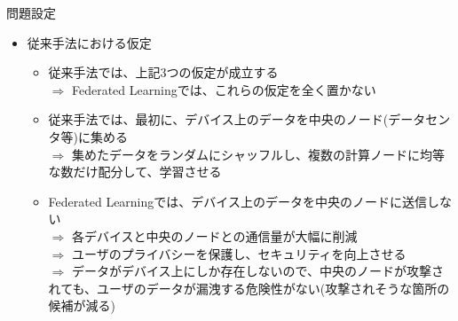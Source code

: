 \documentclass[dvipdfmx,notheorems,t]{beamer}
\begin{document}
\begin{frame}{問題設定}

\begin{itemize}
	\item 従来手法における仮定
	\begin{itemize}
		\item 従来手法では、上記3つの仮定が成立する \\
		$\Rightarrow$ Federated Learningでは、これらの\alert{仮定を全く置かない}
		\newline
		
		\item 従来手法では、最初に、デバイス上のデータを中央のノード(データセンタ等)に集める \\
		$\Rightarrow$ 集めたデータをランダムにシャッフルし、複数の計算ノードに均等な数だけ配分して、学習させる
		\newline
		
		\item Federated Learningでは、デバイス上のデータを中央のノードに送信しない \\
		$\Rightarrow$ 各デバイスと中央のノードとの通信量が大幅に削減 \\
		$\Rightarrow$ ユーザのプライバシーを保護し、セキュリティを向上させる \\
		$\Rightarrow$ データがデバイス上にしか存在しないので、中央のノードが攻撃されても、ユーザのデータが漏洩する危険性がない(攻撃されそうな箇所の候補が減る)
	\end{itemize}
\end{itemize}

\end{frame}
\end{document}
